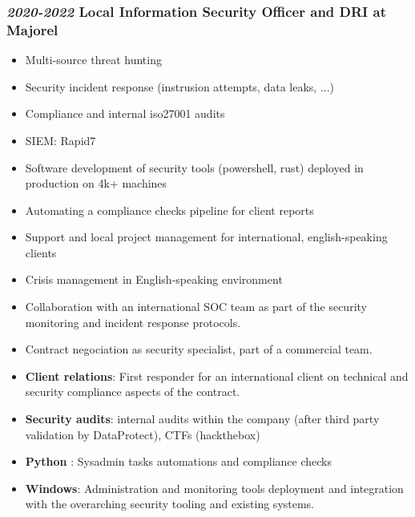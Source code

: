 \documentclass[a4paper, oneside, final]{scrartcl} %
\begin{document}
\begin{center}
\subsubsection*{ \textit{\textbf{2020-2022}} Local Information Security Officer and DRI at Majorel}
\begin{itemize}
\item Multi-source threat hunting
\item Security incident response (instrusion attempts, data leaks, ...)
\item Compliance and internal iso27001 audits
\item SIEM: Rapid7
\item Software development of security tools (powershell, rust) deployed in production on 4k+ machines
\item Automating a compliance checks pipeline for client reports
\item Support and local project management for international, english-speaking clients
\item Crisis management in English-speaking environment
\item Collaboration with an international SOC team as part of the security monitoring and incident response protocols.
\item Contract negociation as security specialist, part of a commercial team.
\item \textbf{Client relations}: First responder for an international client on technical and security compliance aspects of the contract.
\item \textbf{Security audits}: internal audits within the company (after third party validation by DataProtect), CTFs (hackthebox)
\item \textbf{Python} : Sysadmin tasks automations and compliance checks
\item \textbf{Windows}: Administration and monitoring tools deployment and integration with the overarching security tooling and existing systems.
\end{itemize}


\end{center}
\end{document}
